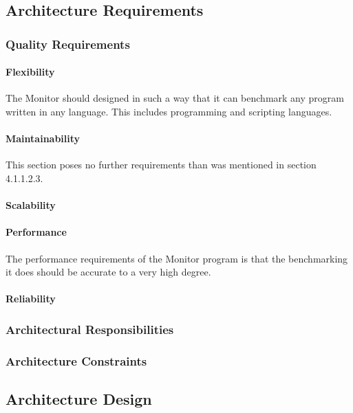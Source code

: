 
\subsection{Architecture Requirements}


\subsubsection{Quality Requirements}
\paragraph{Flexibility}
The Monitor should designed in such a way that it can benchmark any program
written in any language. This includes programming and scripting languages.

\paragraph{Maintainability}
This section poses no further requirements than was mentioned in
section 4.1.1.2.3.

\paragraph{Scalability}


\paragraph{Performance}
The performance requirements of the Monitor program is that the benchmarking
it does should be accurate to a very high degree.

\paragraph{Reliability}


\subsubsection{Architectural Responsibilities}


\subsubsection{Architecture Constraints}


\subsection{Architecture Design}
